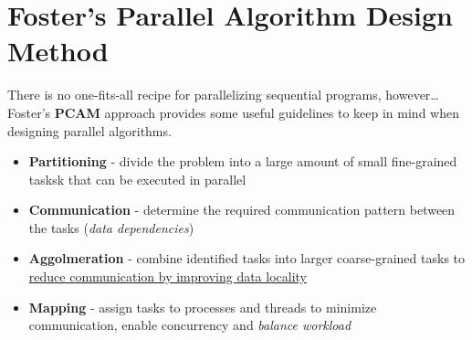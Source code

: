 \section{Foster's Parallel Algorithm Design Method}
There is no one-fits-all recipe for parallelizing sequential programs, however\dots Foster's \textbf{PCAM} approach provides some useful guidelines to keep in mind when designing parallel algorithms.

\begin{itemize}
   \item \textbf{Partitioning} - divide the problem into a large amount of small fine-grained tasksk that can be executed in parallel
   \item \textbf{Communication} - determine the required communication pattern between the tasks (\textit{data dependencies})
   \item \textbf{Aggolmeration} - combine identified tasks into larger coarse-grained tasks to \ul{reduce communication by improving data locality}
   \item \textbf{Mapping} - assign tasks to processes and threads to minimize communication, enable concurrency and \textit{balance workload}
\end{itemize}
